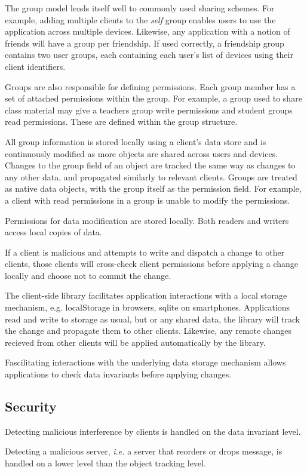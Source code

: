 The group model lends itself well to commonly used sharing schemes. For example, adding multiple clients to the \textit{self} group enables users to use the application across multiple devices. Likewise, any application with a notion of friends will have a group per friendship. If used correctly, a friendship group contains two user groups, each containing each user's list of devices using their client identifiers.

Groups are also responsible for defining permissions. Each group member has a set of attached permissions within the group. For example, a group used to share class material may give a teachers group write permissions and student groups read permissions. These are defined within the group structure.

All group information is stored locally using a client's data store and is continuously modified as more objects are shared across users and devices.
Changes to the group field of an object are tracked the same way as changes to any other data, and propagated similarly to relevant clients. Groups are treated as \name{} native data objects, with the group itself as the permission field. For example, a client with read permissions in a group is unable to modify the permissions. 

Permissions for data modification are stored locally. Both readers and writers access local copies of data. 

If a client is malicious and attempts to write and dispatch a change to other clients, those clients will cross-check client permissions before applying a change locally and choose not to commit the change.


The \name{} client-side library facilitates application interactions with a local storage mechanism, e.g. localStorage in browsers, sqlite on smartphones. Applications read and write to storage as usual, but or any shared data, the library will track the change and propagate them to other clients. Likewise, any remote changes recieved from other clients will be applied automatically by the library.

Fascilitating interactions with the underlying data storage mechanism allows \name{} applications to check data invariants before applying changes. 

\subsection{Security}
Detecting malicious interference by clients is handled on the data invariant level.

Detecting a malicious server, \textit{i.e.} a server that reorders or drops message, is handled on a lower level than the object tracking level. 